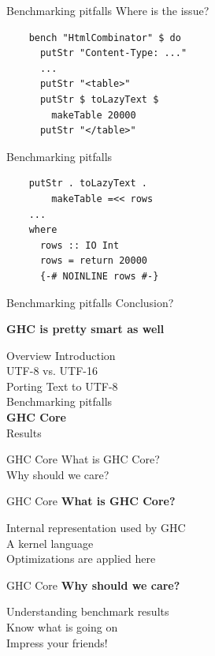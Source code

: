 \documentclass[20pt]{beamer}
\newcommand{\vspaced}{
    \vspace{5mm}
}
\begin{document}
\begin{frame}[fragile]{Benchmarking pitfalls}
    Where is the issue? \\
    \vspaced
    \begin{lstlisting}
    bench "HtmlCombinator" $ do
      putStr "Content-Type: ..."
      ...
      putStr "<table>"
      putStr $ toLazyText $
        makeTable 20000
      putStr "</table>"
    \end{lstlisting}
\end{frame}

\begin{frame}[fragile]{Benchmarking pitfalls}
    \begin{lstlisting}
    putStr . toLazyText .
        makeTable =<< rows
    ...
    where
      rows :: IO Int
      rows = return 20000
      {-# NOINLINE rows #-}
    \end{lstlisting}
\end{frame}

\begin{frame}{Benchmarking pitfalls}
    Conclusion? \\
    \vspaced
    \textbf{GHC is pretty smart as well}
\end{frame}


\begin{frame}{Overview}
    Introduction \\
    UTF-8 vs. UTF-16 \\
    Porting Text to UTF-8 \\
    Benchmarking pitfalls \\
    \textbf{GHC Core} \\
    Results
\end{frame}

\begin{frame}{GHC Core}
    What is GHC Core? \\
    Why should we care?
\end{frame}

\begin{frame}{GHC Core}
    \textbf{What is GHC Core?} \\
    \vspaced
    Internal representation used by GHC \\
    A kernel language \\
    Optimizations are applied here
\end{frame}

\begin{frame}{GHC Core}
    \textbf{Why should we care?} \\
    \vspaced
    Understanding benchmark results \\
    Know what is going on \\
    Impress your friends!
\end{frame}
\end{document}
